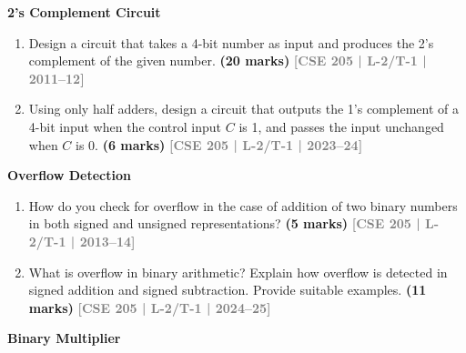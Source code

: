 \documentclass[12pt,a4paper]{article}
\newcommand{\yr}[1]{\hfill\textcolor{gray}{\small\textbf{[#1]}}}
\newcommand{\mk}[1]{\textcolor{orange!70!black}{\small\textbf{(#1 marks)}}}
\newcommand{\subtopic}[2]{%
  \vspace{10pt}
  \noindent\begin{tcolorbox}[colback=#1!8,colframe=#1,boxrule=0.6pt,arc=4pt,
    left=6pt,right=6pt,top=4pt,bottom=4pt]
    \small\bfseries\textcolor{#1}{#2}
  \end{tcolorbox}
  \vspace{2pt}
}
\begin{document}
\subtopic{cD}{2's Complement Circuit}
\label{sub:s4-2scomp}

\begin{enumerate}

\item Design a circuit that takes a 4-bit number as input and produces the 2's complement of the given number.
\mk{20} \yr{CSE 205 | L-2/T-1 | 2011--12}

\item Using only half adders, design a circuit that outputs the 1's complement of a 4-bit input when the control input $C$ is 1, and passes the input unchanged when $C$ is 0.
\mk{6} \yr{CSE 205 | L-2/T-1 | 2023--24}

\end{enumerate}

\subtopic{cD}{Overflow Detection}
\label{sub:s4-overflow}

\begin{enumerate}

\item How do you check for overflow in the case of addition of two binary numbers in both signed and unsigned representations?
\mk{5} \yr{CSE 205 | L-2/T-1 | 2013--14}

\item What is overflow in binary arithmetic? Explain how overflow is detected in signed addition and signed subtraction. Provide suitable examples.
\mk{11} \yr{CSE 205 | L-2/T-1 | 2024--25}

\end{enumerate}

\subtopic{cD}{Binary Multiplier}
\label{sub:s4-multiplier}
\end{document}
